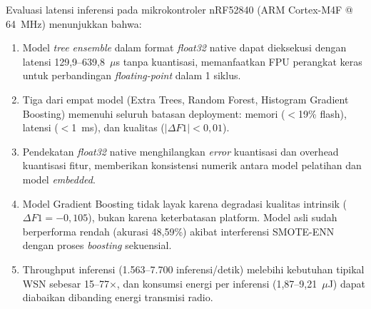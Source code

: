 Evaluasi latensi inferensi pada mikrokontroler nRF52840 (ARM Cortex-M4F @ 64~MHz) menunjukkan bahwa:

\begin{enumerate}
    \item Model \textit{tree ensemble} dalam format \textit{float32} native dapat dieksekusi dengan latensi 129,9--639,8~$\mu$s tanpa kuantisasi, memanfaatkan FPU perangkat keras untuk perbandingan \textit{floating-point} dalam 1 siklus.

    \item Tiga dari empat model (Extra Trees, Random Forest, Histogram Gradient Boosting) memenuhi seluruh batasan deployment: memori ($<$19\% flash), latensi ($<$1~ms), dan kualitas ($|\Delta F1| < 0{,}01$).

    \item Pendekatan \textit{float32} native menghilangkan \textit{error} kuantisasi dan overhead kuantisasi fitur, memberikan konsistensi numerik antara model pelatihan dan model \textit{embedded}.

    \item Model Gradient Boosting tidak layak karena degradasi kualitas intrinsik ($\Delta F1 = -0{,}105$), bukan karena keterbatasan platform. Model asli sudah berperforma rendah (akurasi 48,59\%) akibat interferensi SMOTE-ENN dengan proses \textit{boosting} sekuensial.

    \item Throughput inferensi (1.563--7.700 inferensi/detik) melebihi kebutuhan tipikal WSN sebesar 15--77$\times$, dan konsumsi energi per inferensi (1,87--9,21~$\mu$J) dapat diabaikan dibanding energi transmisi radio.
\end{enumerate}
